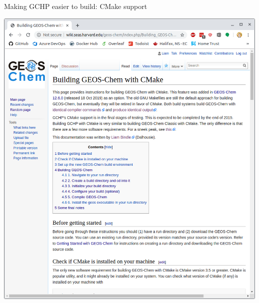 \documentclass[10pt]{beamer}
\begin{document}
\begin{frame}[fragile]{Making GCHP easier to build: CMake support}
\begin{minipage}[c]{0.6\textwidth}
    \end{minipage}
    \begin{minipage}[c]{0.39\textwidth}
        \includegraphics[width=\textwidth]{cmake.png}
    \end{minipage}
\end{frame}
\end{document}
